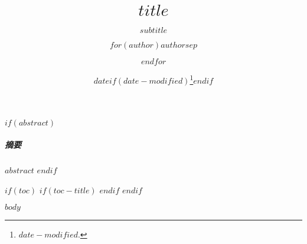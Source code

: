 \documentclass[fontset=fandol, zihao=5]{ctexart}
\title{$title$}
\subtitle{$subtitle$}
\author{$for(author)$$author$$sep$ \and $endfor$}
\date{$date$$if(date-modified)$\thanks{\transmodified \space $date-modified$.}$endif$}
\def\transtoc{目录}
\def\transtoc{Table of Contents}
\renewenvironment{abstract}{\subparagraph{摘要}\kaishu}{}
\theoremstyle{suncnthm}
\theoremstyle{definition}
\theoremstyle{remark}
\begin{document}
\maketitle

$if(abstract)$
\begin{abstract}
    $abstract$
\end{abstract}
$endif$

$if(toc)$
$if(toc-title)$
\renewcommand*\contentsname{\transtoc}
$endif$
{
\setcounter{tocdepth}{$toc-depth$}
\tableofcontents
}
$endif$

$body$

\ifzh
  \printbibliography[title={参考文献}]
\else
  \printbibliography
\fi
\end{document}
